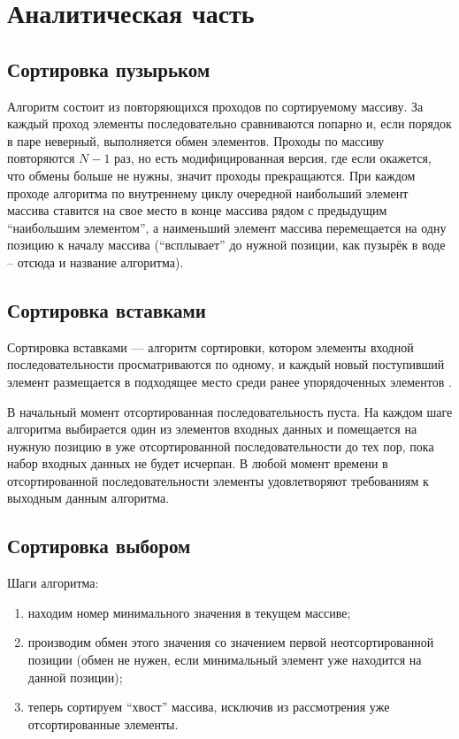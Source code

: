 \chapter{Аналитическая часть}

\section{Сортировка пузырьком}

Алгоритм состоит из повторяющихся проходов по сортируемому массиву.
За каждый проход элементы последовательно сравниваются попарно и, если порядок в паре неверный, выполняется обмен элементов.
Проходы по массиву повторяются $N-1$ раз, но есть модифицированная версия, где если окажется, что обмены больше не нужны, значит проходы прекращаются.
При каждом проходе алгоритма по внутреннему циклу очередной наибольший элемент массива ставится на свое место в конце массива рядом с предыдущим ``наибольшим элементом'', а наименьший элемент массива перемещается на одну позицию к началу массива (``всплывает'' до нужной позиции, как пузырёк в воде -- отсюда и название алгоритма).

\section{Сортировка вставками}

Сортировка вставками — алгоритм сортировки, котором элементы входной последовательности просматриваются по одному, и каждый новый поступивший элемент размещается в подходящее место среди ранее упорядоченных элементов \cite{Knut}.

В начальный момент отсортированная последовательность пуста.
На каждом шаге алгоритма выбирается один из элементов входных данных и помещается на нужную позицию в уже отсортированной последовательности до тех пор, пока набор входных данных не будет исчерпан.
В любой момент времени в отсортированной последовательности элементы удовлетворяют требованиям к выходным данным алгоритма.

\section{Сортировка выбором}

Шаги алгоритма:
\begin{enumerate}
	\item находим номер минимального значения в текущем массиве;
	\item производим обмен этого значения со значением первой неотсортированной позиции (обмен не нужен, если минимальный элемент уже находится на данной позиции);
	\item теперь сортируем ``хвост'' массива, исключив из рассмотрения уже отсортированные элементы.
\end{enumerate}

